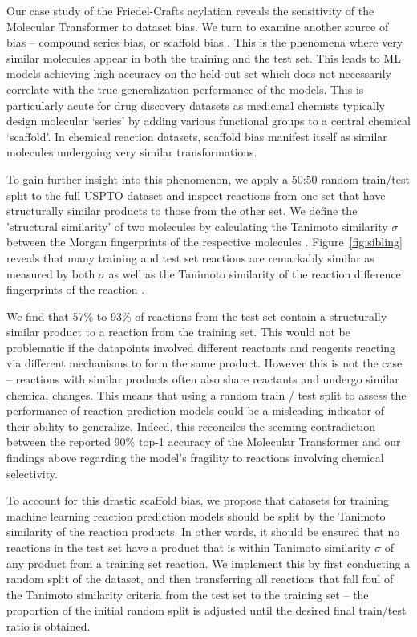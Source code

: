 Our case study of the Friedel-Crafts acylation reveals the sensitivity of the Molecular Transformer to dataset bias. We turn to examine another source of bias -- compound series bias, or scaffold bias \cite{Mayr2018compare}. This is the phenomena where very similar molecules appear in both the training and the test set. This leads to ML models achieving high accuracy on the held-out set which does not necessarily correlate with the true generalization performance of the models. This is particularly acute for drug discovery datasets as medicinal chemists typically design molecular `series' by adding various functional groups to a central chemical `scaffold'. In chemical reaction datasets, scaffold bias manifest itself as similar molecules undergoing very similar transformations.

To gain further insight into this phenomenon, we apply a 50:50 random train/test split to the full USPTO dataset and inspect reactions from one set that have structurally similar products to those from the other set. We define the 'structural similarity' of two molecules by calculating the Tanimoto similarity $\sigma$ between the Morgan fingerprints of the respective molecules \cite{Bajusz2015Tanimoto}. Figure~\ref{fig:sibling} reveals that many training and test set reactions are remarkably similar as measured by both $\sigma$ as well as the Tanimoto similarity of the reaction difference fingerprints of the reaction \cite{Schneider2015rxnfp}.

We find that 57\% to 93\% of reactions from the test set contain a structurally similar product to a reaction from the training set. This would not be problematic if the datapoints involved different reactants and reagents reacting via different mechanisms to form the same product. However this is not the case -- reactions with similar products often also share reactants and undergo similar chemical changes. This means that using a random train / test split to assess the performance of reaction prediction models could be a misleading indicator of their ability to generalize. Indeed, this reconciles the seeming contradiction between the reported 90\% top-1 accuracy of the Molecular Transformer and our findings above regarding the model's fragility to reactions involving chemical selectivity.

To account for this drastic scaffold bias, we propose that datasets for training machine learning reaction prediction models should be split by the Tanimoto similarity of the reaction products. In other words, it should be ensured that no reactions in the test set have a product that is within Tanimoto similarity $\sigma$ of any product from a training set reaction. We implement this by first conducting a random split of the dataset, and then transferring all reactions that fall foul of the Tanimoto similarity criteria from the test set to the training set -- the proportion of the initial random split is adjusted until the desired final train/test ratio is obtained.

